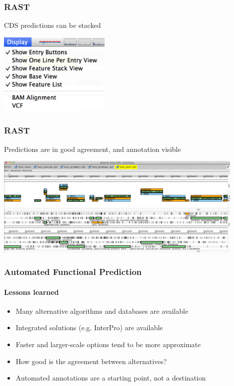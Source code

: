 \documentclass[table]{beamer}
\begin{document}
    \begin{frame}
      \frametitle{RAST}   
      CDS predictions can be stacked
      \begin{center}
        \includegraphics[width=0.4\textwidth]{images/rast1} 
      \end{center}        
    \end{frame}

    \begin{frame}
      \frametitle{RAST}   
      Predictions are in good agreement, and annotation visible
      \begin{center}
        \includegraphics[width=0.9\textwidth]{images/rast2} 
      \end{center}        
    \end{frame}

    \begin{frame}
      \frametitle{Automated Functional Prediction}   
      \framesubtitle{Lessons learned}   
      \begin{itemize}
        \item Many alternative algorithms and databases are available 
        \item Integrated solutions (e.g. InterPro) are available
        \item Faster and larger-scale options tend to be more approximate
        \item How good is the agreement between alternatives?
        \item Automated annotations are a starting point, not a destination
      \end{itemize}
    \end{frame}
\end{document}
